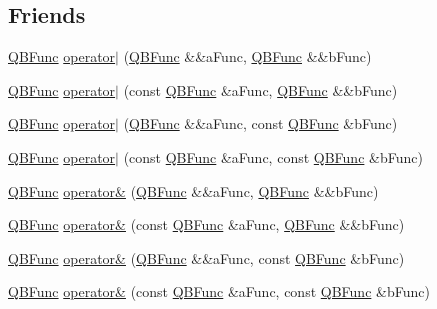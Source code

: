 \subsection*{Friends}
\begin{DoxyCompactItemize}
\item 
\hyperlink{classQuickMath_1_1QBFunc}{Q\+B\+Func} \hyperlink{classQuickMath_1_1QBFunc_ab5ddbe52d9e3c77edaccf5dc984611c0}{operator$\vert$} (\hyperlink{classQuickMath_1_1QBFunc}{Q\+B\+Func} \&\&a\+Func, \hyperlink{classQuickMath_1_1QBFunc}{Q\+B\+Func} \&\&b\+Func)
\item 
\hyperlink{classQuickMath_1_1QBFunc}{Q\+B\+Func} \hyperlink{classQuickMath_1_1QBFunc_a4ffb75b9e72172624ef4ab5bba5f7f30}{operator$\vert$} (const \hyperlink{classQuickMath_1_1QBFunc}{Q\+B\+Func} \&a\+Func, \hyperlink{classQuickMath_1_1QBFunc}{Q\+B\+Func} \&\&b\+Func)
\item 
\hyperlink{classQuickMath_1_1QBFunc}{Q\+B\+Func} \hyperlink{classQuickMath_1_1QBFunc_a9076b9b85f7f2a91292956e80cbba9bc}{operator$\vert$} (\hyperlink{classQuickMath_1_1QBFunc}{Q\+B\+Func} \&\&a\+Func, const \hyperlink{classQuickMath_1_1QBFunc}{Q\+B\+Func} \&b\+Func)
\item 
\hyperlink{classQuickMath_1_1QBFunc}{Q\+B\+Func} \hyperlink{classQuickMath_1_1QBFunc_adc04fcf3b6ca182c537429de8b5503a3}{operator$\vert$} (const \hyperlink{classQuickMath_1_1QBFunc}{Q\+B\+Func} \&a\+Func, const \hyperlink{classQuickMath_1_1QBFunc}{Q\+B\+Func} \&b\+Func)
\item 
\hyperlink{classQuickMath_1_1QBFunc}{Q\+B\+Func} \hyperlink{classQuickMath_1_1QBFunc_a031286a681bc932973710fa5605099e3}{operator\&} (\hyperlink{classQuickMath_1_1QBFunc}{Q\+B\+Func} \&\&a\+Func, \hyperlink{classQuickMath_1_1QBFunc}{Q\+B\+Func} \&\&b\+Func)
\item 
\hyperlink{classQuickMath_1_1QBFunc}{Q\+B\+Func} \hyperlink{classQuickMath_1_1QBFunc_aeb45759e52c5c774050571a45103d512}{operator\&} (const \hyperlink{classQuickMath_1_1QBFunc}{Q\+B\+Func} \&a\+Func, \hyperlink{classQuickMath_1_1QBFunc}{Q\+B\+Func} \&\&b\+Func)
\item 
\hyperlink{classQuickMath_1_1QBFunc}{Q\+B\+Func} \hyperlink{classQuickMath_1_1QBFunc_a73bf3e8152a5065c9737541866334c94}{operator\&} (\hyperlink{classQuickMath_1_1QBFunc}{Q\+B\+Func} \&\&a\+Func, const \hyperlink{classQuickMath_1_1QBFunc}{Q\+B\+Func} \&b\+Func)
\item 
\hyperlink{classQuickMath_1_1QBFunc}{Q\+B\+Func} \hyperlink{classQuickMath_1_1QBFunc_a317711026cc82cd1a77e03c7b0c8dc4d}{operator\&} (const \hyperlink{classQuickMath_1_1QBFunc}{Q\+B\+Func} \&a\+Func, const \hyperlink{classQuickMath_1_1QBFunc}{Q\+B\+Func} \&b\+Func)

\end{DoxyCompactItemize}
